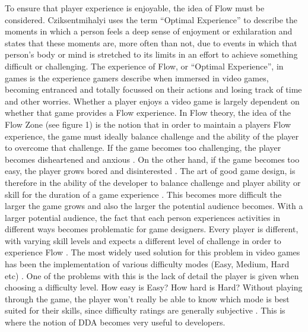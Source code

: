\documentclass[journal]{IEEEtran}
\begin{document}
To ensure that player experience is enjoyable, the idea of Flow must be considered. Cziksentmihalyi \cite{czikszentmihalyi1990flow} \cite{csikszentmihalyi2014toward} uses the term ``Optimal Experience'' to describe the moments in which a person feels a deep sense of enjoyment or exhilaration and states that these moments are, more often than not, due to events in which that person's body or mind is stretched to its limits in an effort to achieve something difficult or challenging.
The experience of Flow, or ``Optimal Experience'', in games is the experience gamers describe when immersed in video games, becoming entranced and totally focussed on their actions and losing track of time and other worries. Whether a player enjoys a video game is largely dependent on whether that game provides a Flow experience. In Flow theory, the idea of the Flow Zone (see figure 1) is the notion that in order to maintain a players Flow experience, the game must ideally balance challenge and the ability of the player to overcome that challenge. If the game becomes too challenging, the player becomes disheartened and anxious \cite{gilleade2004using}. On the other hand, if the game becomes too easy, the player grows bored and disinterested \cite{chanel2008boredom}. The art of good game design, is therefore in the ability of the developer to balance challenge and player ability or skill for the duration of a game experience \cite{koster2013theory}. This becomes more difficult the larger the game grows and also the larger the potential audience becomes. With a larger potential audience, the fact that each person experiences activities in different ways becomes problematic for game designers. Every player is different, with varying skill levels and expects a different level of challenge in order to experience Flow \cite{czikszentmihalyi1990flow}. The most widely used solution for this problem in video games has been the implementation of various difficulty modes (Easy, Medium, Hard etc) \cite{alexander2013investigation}. One of the problems with this is the lack of detail the player is given when choosing a difficulty level. How easy is Easy? How hard is Hard? Without playing through the game, the player won't really be able to know which mode is best suited for their skills, since difficulty ratings are generally subjective \cite{qin2009effects}. This is where the notion of DDA becomes very useful to developers.
\end{document}
